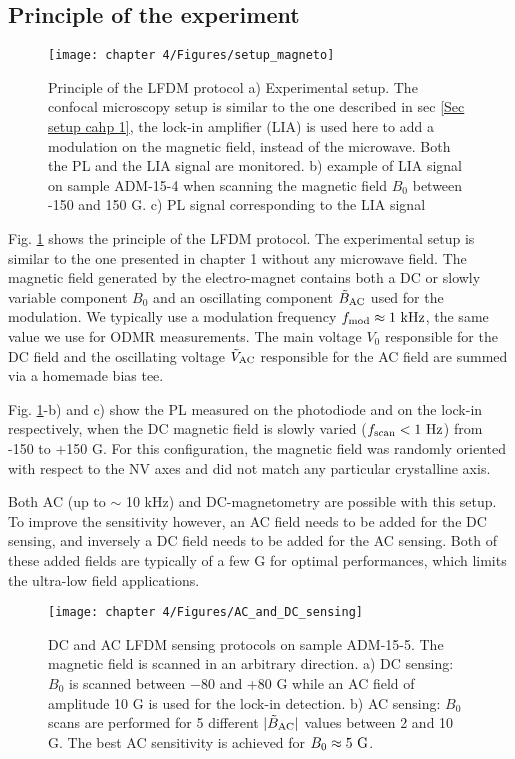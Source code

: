 \documentclass[a4paper, 11pt]{report}
\begin{document}
\subsection{Principle of the experiment}

\begin{figure}[h!]
\centering
\texttt{[image: chapter 4/Figures/setup\_magneto]}
\caption{Principle of the LFDM protocol a) Experimental setup. The confocal microscopy setup is similar to the one described in sec \ref{Sec setup cahp 1}, the lock-in amplifier (LIA) is used here to add a modulation on the magnetic field, instead of the microwave. Both the PL and the LIA signal are monitored. b) example of LIA signal on sample ADM-15-4 when scanning the magnetic field $B_0$ between -150 and 150 G. c) PL signal corresponding to the LIA signal}
\label{setup magneto}
\end{figure}

Fig. \ref{setup magneto} shows the principle of the LFDM protocol. The experimental setup is similar to the one presented in chapter 1 without any microwave field. The magnetic field generated by the electro-magnet contains both a DC or slowly variable component $B_0$ and an oscillating component $\tilde{B}_{\rm AC}$ used for the modulation. We typically use a modulation frequency $f_{\rm mod} \approx 1\ \rm kHz$, the same value we use for ODMR measurements. The main voltage $V_0$ responsible for the DC field and the oscillating voltage $\tilde{V}_{\rm AC}$ responsible for the AC field are summed via a homemade bias tee.

Fig. \ref{setup magneto}-b) and c) show the PL measured on the photodiode and on the lock-in respectively, when the DC magnetic field is slowly varied ($f_{\rm scan}<1\ \rm Hz$) from -150 to +150 G. For this configuration, the magnetic field was randomly oriented with respect to the NV axes and did not match any particular crystalline axis.

Both AC (up to $\sim$ 10 kHz) and DC-magnetometry are possible with this setup. To improve the sensitivity however, an AC field needs to be added for the DC sensing, and inversely a DC field needs to be added for the AC sensing. Both of these added fields are typically of a few G for optimal performances, which limits the ultra-low field applications.

\begin{figure}[h!]
\centering
\texttt{[image: chapter 4/Figures/AC\_and\_DC\_sensing]}
\caption{DC and AC LFDM sensing protocols on sample ADM-15-5. The magnetic field is scanned in an arbitrary direction. a) DC sensing: $B_0$ is scanned between $-$80 and +80 G while an AC field of amplitude 10 G is used for the lock-in detection. b) AC sensing: $B_0$ scans are performed for 5 different $|\tilde B_{\rm AC}|$ values between 2 and 10 G. The best AC sensitivity is achieved for $B_0\approx 5\ \rm G$.}
\label{AC and DC sensing}
\end{figure}
\end{document}
